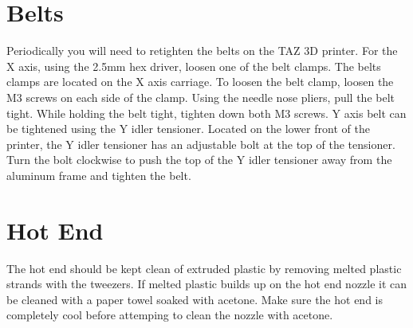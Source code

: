 \section{Belts}
Periodically you will need to retighten the belts on the TAZ 3D printer. For the X axis, using the 2.5mm hex driver, loosen one of the belt clamps. The belts clamps are located on the X axis carriage. To loosen the belt clamp, loosen the M3 screws on each side of the clamp. Using the needle nose pliers, pull the belt tight. While holding the belt tight, tighten down both M3 screws. Y axis belt can be tightened using the Y idler tensioner. Located on the lower front of the printer, the Y idler tensioner has an adjustable bolt at the top of the tensioner. Turn the bolt clockwise to push the top of the Y idler tensioner away from the aluminum frame and tighten the belt.

\section{Hot End}
The hot end should be kept clean of extruded plastic by removing melted plastic strands with the tweezers. If melted plastic builds up on the hot end nozzle it can be cleaned with a paper towel soaked with acetone. Make sure the hot end is completely cool before attemping to clean the nozzle with acetone.
